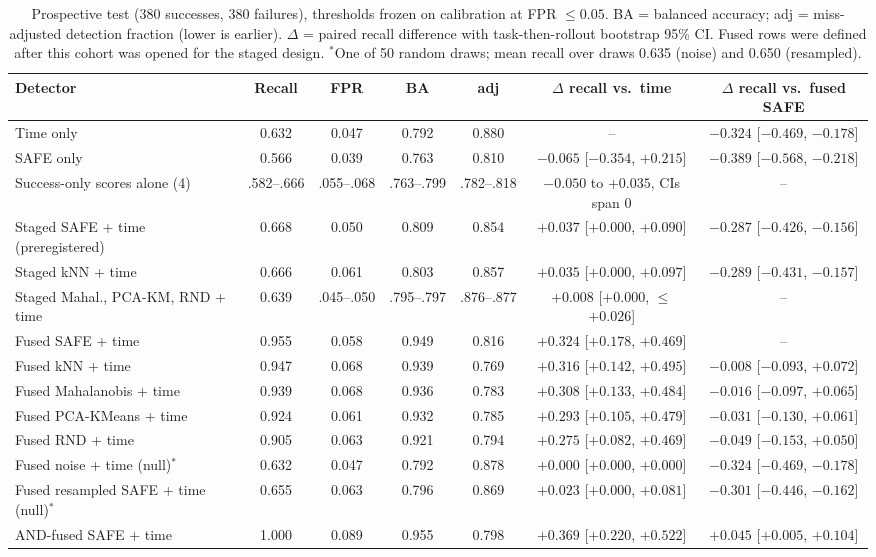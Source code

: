 \documentclass[conference,a4paper]{IEEEtran}
\begin{document}
\begin{table}[t]
\centering
\caption{Prospective test (380 successes, 380 failures), thresholds frozen on calibration
at FPR $\le 0.05$. BA = balanced accuracy; adj = miss-adjusted detection fraction (lower is
earlier). $\Delta$ = paired recall difference with task-then-rollout bootstrap 95\% CI.
Fused rows were defined after this cohort was opened for the staged design. $^\ast$One of
50 random draws; mean recall over draws 0.635 (noise) and 0.650 (resampled).}
\label{tab:main}
\footnotesize
\setlength{\tabcolsep}{3.2pt}
\begin{tabular}{@{}lcccccc@{}}
\toprule
Detector & Recall & FPR & BA & adj & $\Delta$ recall vs.\ time & $\Delta$ recall vs.\ fused SAFE \\
\midrule
Time only & 0.632 & 0.047 & 0.792 & 0.880 & -- & $-0.324$ [$-0.469$, $-0.178$] \\
SAFE only & 0.566 & 0.039 & 0.763 & 0.810 & $-0.065$ [$-0.354$, $+0.215$] & $-0.389$ [$-0.568$, $-0.218$] \\
Success-only scores alone (4) & .582--.666 & .055--.068 & .763--.799 & .782--.818 & $-0.050$ to $+0.035$, CIs span 0 & -- \\
Staged SAFE + time (preregistered) & 0.668 & 0.050 & 0.809 & 0.854 & $+0.037$ [$+0.000$, $+0.090$] & $-0.287$ [$-0.426$, $-0.156$] \\
Staged kNN + time & 0.666 & 0.061 & 0.803 & 0.857 & $+0.035$ [$+0.000$, $+0.097$] & $-0.289$ [$-0.431$, $-0.157$] \\
Staged Mahal., PCA-KM, RND + time & 0.639 & .045--.050 & .795--.797 & .876--.877 & $+0.008$ [$+0.000$, $\le$$+0.026$] & -- \\
\midrule
Fused SAFE + time & 0.955 & 0.058 & 0.949 & 0.816 & $+0.324$ [$+0.178$, $+0.469$] & -- \\
Fused kNN + time & 0.947 & 0.068 & 0.939 & 0.769 & $+0.316$ [$+0.142$, $+0.495$] & $-0.008$ [$-0.093$, $+0.072$] \\
Fused Mahalanobis + time & 0.939 & 0.068 & 0.936 & 0.783 & $+0.308$ [$+0.133$, $+0.484$] & $-0.016$ [$-0.097$, $+0.065$] \\
Fused PCA-KMeans + time & 0.924 & 0.061 & 0.932 & 0.785 & $+0.293$ [$+0.105$, $+0.479$] & $-0.031$ [$-0.130$, $+0.061$] \\
Fused RND + time & 0.905 & 0.063 & 0.921 & 0.794 & $+0.275$ [$+0.082$, $+0.469$] & $-0.049$ [$-0.153$, $+0.050$] \\
\midrule
Fused noise + time (null)$^\ast$ & 0.632 & 0.047 & 0.792 & 0.878 & $+0.000$ [$+0.000$, $+0.000$] & $-0.324$ [$-0.469$, $-0.178$] \\
Fused resampled SAFE + time (null)$^\ast$ & 0.655 & 0.063 & 0.796 & 0.869 & $+0.023$ [$+0.000$, $+0.081$] & $-0.301$ [$-0.446$, $-0.162$] \\
AND-fused SAFE + time & 1.000 & 0.089 & 0.955 & 0.798 & $+0.369$ [$+0.220$, $+0.522$] & $+0.045$ [$+0.005$, $+0.104$] \\
\bottomrule
\end{tabular}
\end{table}
\end{document}

